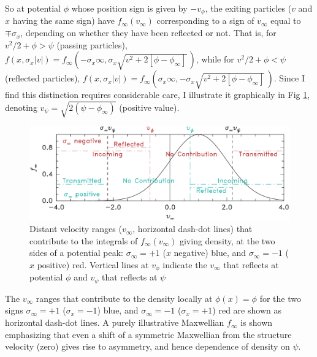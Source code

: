 \documentclass[pre]{revtex4-2}
\begin{document}
So at potential $\phi$ whose position sign is given by $-v_\phi$, the
exiting particles ($v$ and $x$ having the same sign) have
$f_\infty(v_\infty)$ corresponding to a sign of $v_\infty$ equal to
$\mp \sigma_x$, depending on whether they have been reflected or not.
That is, for $v^2/2+\phi>\psi$ (passing particles),
$f(x,\sigma_x|v|)=
f_\infty(-\sigma_x\infty,\sigma_x\sqrt{v^2+2[\phi-\phi_\infty]}\,)$,
while for $v^2/2+\phi<\psi$ (reflected particles),
$f(x,\sigma_x|v|)=
f_\infty(\sigma_x\infty,-\sigma_x\sqrt{v^2+2[\phi-\phi_\infty]}\,)$. Since
I find this distinction requires considerable care, I illustrate it
graphically in Fig \ref{contribs}, denoting
$v_\psi=\sqrt{2(\psi-\phi_\infty)}$ (positive value).
\begin{figure}[htp]
\centering
\includegraphics[width=.8\hsize]{contribs}  
\caption{Distant velocity ranges ($v_\infty$, horizontal dash-dot
  lines) that contribute to the integrals of $f_\infty(v_\infty)$
  giving density, at the two sides of a potential peak: $\sigma_\infty=+1$
  ($x$ negative) blue, and $\sigma_\infty=-1$ ($x$ positive) red. Vertical
  lines at $v_\phi$ indicate the $v_\infty$ that reflects at potential
  $\phi$ and $v_\psi$ that reflects at $\psi$ }\label{contribs}
\end{figure}
The $v_\infty$ ranges that contribute to the
density locally at $\phi(x)=\phi$ for the two signs $\sigma_\infty=+1$
($\sigma_x=-1$) blue, and $\sigma_\infty=-1$ ($\sigma_x=+1$) red are
shown as horizontal dash-dot lines.
 A purely
illustrative Maxwellian $f_\infty$ is shown emphasizing that even a
shift of a symmetric Maxwellian from the structure velocity (zero)
gives rise to asymmetry, and hence dependence of density on $\psi$. 
\end{document}
